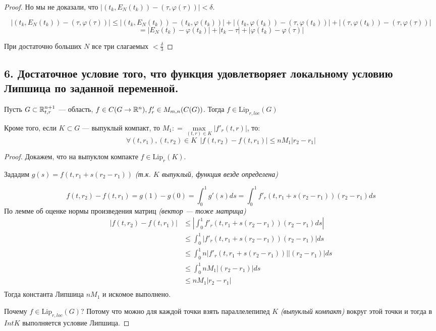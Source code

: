 \begin{proof}
    Но мы не доказали, что \(|(t_k, E_N(t_k)) - (\tau, \varphi(\tau))| < \delta\).

    \[|(t_k, E_N(t_k)) - (\tau, \varphi(\tau))| \leq |(t_k, E_N(t_k)) - (t_k, \varphi(t_k))| + |(t_k, \varphi(t_k)) - (\tau, \varphi(t_k))| + |(\tau, \varphi(t_k)) - (\tau, \varphi(\tau))|\]
    \[ = |E_N(t_k) - \varphi(t_k)| + |t_k - \tau| + |\varphi(t_k) - \varphi(\tau)|\]

    При достаточно больших \(N\) все три слагаемых \( < \frac{\delta}{3}\)
\end{proof}

\subsection*{6. Достаточное условие того, что функция удовлетворяет локальному условию Липшица по заданной переменной.}

Пусть \(G\subset \mathbb{R}^{n + 1}_{t, r}\) --- область, \(f\in C(G \to \mathbb{R}^n), f'_r \in M_{m,n}(C(G))\). Тогда \(f\in \text{Lip}_{r, loc}(G)\)

Кроме того, если \(K\subset G\) --- выпуклый компакт, то \(M_1 : = \max\limits_{(t, r)\in K}|f'_r(t, r)|\), то:
\[\forall (t, r_1), (t, r_2)\in K \ \ |f(t, r_2) - f(t, r_1)| \leq nM_1|r_2 - r_1|\]

\begin{proof}
    Докажем, что на выпуклом компакте \(f\in \text{Lip}_r(K)\).

    Зададим \(g(s) = f(t, r_1 + s(r_2 - r_1))\) \textit{(т.к. \(K\) выпуклый, функция везде определена)}

    \[f(t, r_2) - f(t, r_1) = g(1) - g(0) = \int_0^1 g'(s)ds = \int_0^1 f'_r(t, r_1 + s(r_2 - r_1))(r_2 - r_1) ds\]
    По лемме об оценке нормы произведения матриц \textit{(вектор --- тоже матрица)}
    \begin{align*}
        |f(t, r_2) - f(t, r_1)| & \leq \left|\int_0^1 f'_r(t, r_1 + s(r_2 - r_1))(r_2 - r_1) ds\right|     \\
                                & \leq \int_0^1 \left|f'_r(t, r_1 + s(r_2 - r_1))(r_2 - r_1)\right| ds     \\
                                & \leq \int_0^1 n\left|f'_r(t, r_1 + s(r_2 - r_1))| |(r_2 - r_1)\right| ds \\
                                & \leq \int_0^1 nM_1 |(r_2 - r_1)| ds                                      \\
                                & \leq nM_1 |r_2 - r_1|                                                    \\
    \end{align*}
    Тогда константа Липшица \(nM_1\) и искомое выполнено.

    Почему \(f\in \text{Lip}_{r, loc}(G)\)? Потому что можно для каждой точки взять параллелепипед \(K\) \textit{(выпуклый компакт)} вокруг этой точки и тогда в \(Int K\) выполняется условие Липшица.
\end{proof}

